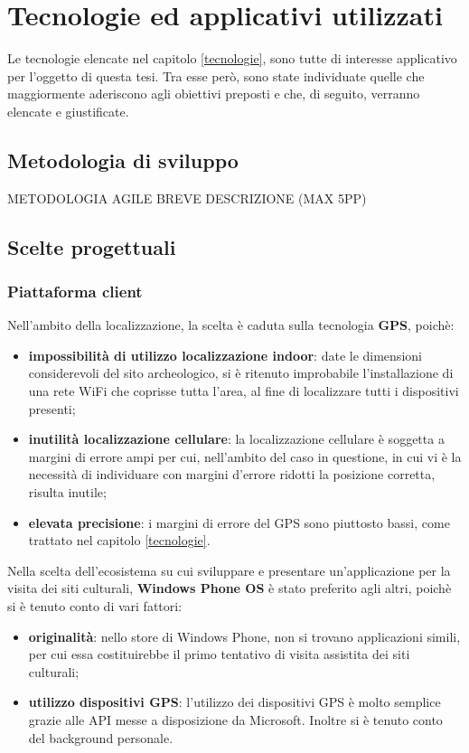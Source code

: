 
\chapter{Tecnologie ed applicativi utilizzati}
\label{tecnologieutilizzate}

Le tecnologie elencate nel capitolo \ref{tecnologie}, sono tutte di interesse applicativo per l'oggetto di questa tesi. Tra esse però, sono state individuate quelle che maggiormente aderiscono agli obiettivi preposti e che, di seguito, verranno elencate e giustificate.
\section{Metodologia di sviluppo}
METODOLOGIA AGILE BREVE DESCRIZIONE (MAX 5PP)

\section{Scelte progettuali}
\subsection{Piattaforma client}
Nell'ambito della localizzazione, la scelta è caduta sulla tecnologia \textbf{GPS}, poichè:
\begin{itemize}
\item \textbf{impossibilità di utilizzo localizzazione indoor}: date le dimensioni considerevoli del sito archeologico, si è ritenuto improbabile l'installazione di una rete WiFi che coprisse tutta l'area, al fine di localizzare tutti i dispositivi presenti;
\item \textbf{inutilità localizzazione cellulare}: la localizzazione cellulare è soggetta a margini di errore ampi per cui, nell'ambito del caso in questione, in cui vi è la necessità di individuare con margini d'errore ridotti la posizione corretta, risulta inutile;
\item \textbf{elevata precisione}: i margini di errore del GPS sono piuttosto bassi, come trattato nel capitolo \ref{tecnologie}.
\end{itemize}


Nella scelta dell'ecosistema su cui sviluppare e presentare un'applicazione per la visita dei siti culturali, \textbf{Windows Phone OS} è stato preferito agli altri, poichè si è tenuto conto di vari fattori:
\begin{itemize}
\item \textbf{originalità}: nello store di Windows Phone, non si trovano applicazioni simili, per cui essa costituirebbe il primo tentativo di visita assistita dei siti culturali;
\item \textbf{utilizzo dispositivi GPS}: l'utilizzo dei dispositivi GPS è molto semplice grazie alle API messe a disposizione da Microsoft. Inoltre si è tenuto conto del background personale.
\end{itemize}


